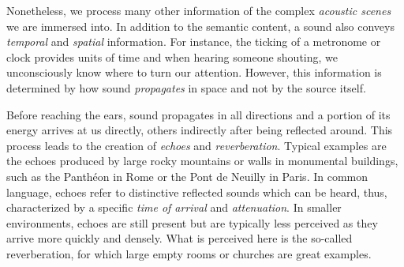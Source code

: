 
\mynewline
Nonetheless, we process many other information of the complex \textit{acoustic scenes} we are immersed into.
In addition to the semantic content, a sound also conveys \textit{temporal} and \textit{spatial} information.
For instance, the ticking of a metronome or clock provides units of time and when hearing someone shouting, we unconsciously know where to turn our attention.
However, this information is determined by how sound \textit{propagates} in space and not by the source itself.

\mynewline
Before reaching the ears, sound propagates in all directions and a portion of its energy arrives at us directly, others indirectly after being reflected around.
This process leads to the creation of \textit{echoes} and \textit{reverberation}.
Typical examples are the echoes produced by large rocky mountains or walls in monumental buildings, such as the Panthéon in Rome or the Pont de Neuilly in Paris.
In common language, echoes refer to distinctive reflected sounds which can be heard, thus, characterized by a specific \textit{time of arrival} and \textit{attenuation}.
In smaller environments, echoes are still present but are typically less perceived as they arrive more quickly and densely.
What is perceived here is the so-called reverberation, for which large empty rooms or churches are great examples.

